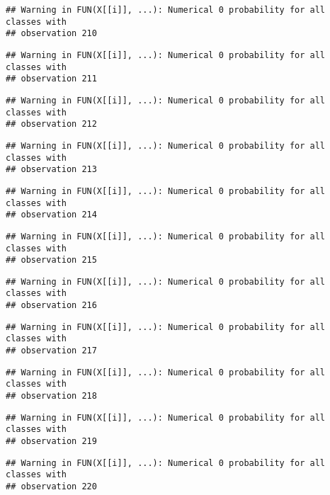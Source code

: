 \documentclass[
]{article}
\begin{document}
\begin{verbatim}
## Warning in FUN(X[[i]], ...): Numerical 0 probability for all classes with
## observation 210
\end{verbatim}

\begin{verbatim}
## Warning in FUN(X[[i]], ...): Numerical 0 probability for all classes with
## observation 211
\end{verbatim}

\begin{verbatim}
## Warning in FUN(X[[i]], ...): Numerical 0 probability for all classes with
## observation 212
\end{verbatim}

\begin{verbatim}
## Warning in FUN(X[[i]], ...): Numerical 0 probability for all classes with
## observation 213
\end{verbatim}

\begin{verbatim}
## Warning in FUN(X[[i]], ...): Numerical 0 probability for all classes with
## observation 214
\end{verbatim}

\begin{verbatim}
## Warning in FUN(X[[i]], ...): Numerical 0 probability for all classes with
## observation 215
\end{verbatim}

\begin{verbatim}
## Warning in FUN(X[[i]], ...): Numerical 0 probability for all classes with
## observation 216
\end{verbatim}

\begin{verbatim}
## Warning in FUN(X[[i]], ...): Numerical 0 probability for all classes with
## observation 217
\end{verbatim}

\begin{verbatim}
## Warning in FUN(X[[i]], ...): Numerical 0 probability for all classes with
## observation 218
\end{verbatim}

\begin{verbatim}
## Warning in FUN(X[[i]], ...): Numerical 0 probability for all classes with
## observation 219
\end{verbatim}

\begin{verbatim}
## Warning in FUN(X[[i]], ...): Numerical 0 probability for all classes with
## observation 220
\end{verbatim}
\end{document}
